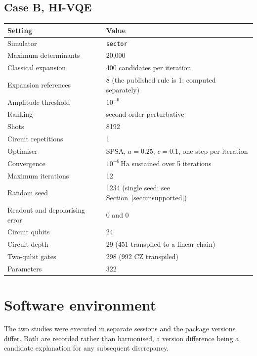 \documentclass[11pt,a4paper]{article}
\newcommand{\Ha}{\ensuremath{\,\mathrm{Ha}}}
\newcommand{\code}[1]{\texttt{\small #1}}
\begin{document}
\subsection{Case B, HI-VQE}

\begin{center}
\small
\begin{tabular}{@{}ll@{}}
\toprule
Setting & Value \\
\midrule
Simulator & \code{sector} \\
Maximum determinants & 20{,}000 \\
Classical expansion & 400 candidates per iteration \\
Expansion references & 8 (the published rule is 1; computed separately) \\
Amplitude threshold & $10^{-6}$ \\
Ranking & second-order perturbative \\
Shots & 8192 \\
Circuit repetitions & 1 \\
Optimiser & SPSA, $a = 0.25$, $c = 0.1$, one step per iteration \\
Convergence & $10^{-6}\Ha$ sustained over 5 iterations \\
Maximum iterations & 12 \\
Random seed & 1234 (single seed; see Section~\ref{sec:unsupported}) \\
Readout and depolarising error & 0 and 0 \\
\midrule
Circuit qubits & 24 \\
Circuit depth & 29 (451 transpiled to a linear chain) \\
Two-qubit gates & 298 (992 CZ transpiled) \\
Parameters & 322 \\
\bottomrule
\end{tabular}
\end{center}

\section{Software environment}
\label{app:env}

The two studies were executed in separate sessions and the package versions
differ. Both are recorded rather than harmonised, a version difference being a
candidate explanation for any subsequent discrepancy.
\end{document}
